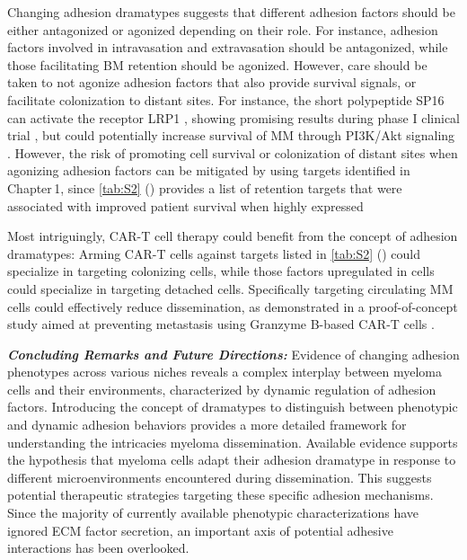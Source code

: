Changing adhesion dramatypes suggests that different adhesion factors should be
either antagonized or agonized depending on their role. For instance, adhesion
factors involved in intravasation and extravasation should be antagonized, while
those facilitating BM retention%
\footterm{\footretentiveadhesionfactors}{\label{foot:retentiveadhesionfactors}}%
should be agonized. However, care should be taken to not agonize adhesion
factors that also provide survival signals, or facilitate colonization to
distant sites. For instance, the short polypeptide SP16 can activate the
receptor LRP1 , showing promising results during phase I
clinical trial \cite{wohlfordPhaseClinicalTrial2021}, but could potentially
increase survival of MM through PI3K/Akt signaling
\cite{potereDevelopingLRP1Agonists2019, heinemannInhibitingPI3KAKT2022}.
However, the risk of promoting cell survival or colonization of distant sites
when agonizing adhesion factors can be mitigated by using targets identified in
Chapter\,1, since \autoref{tab:S2} () provides a list of
retention targets that were associated
with improved patient survival when highly expressed 

Most intriguingly, CAR-T cell therapy could benefit from the concept of adhesion
dramatypes: Arming CAR-T cells against targets listed in \autoref{tab:S2}
() could specialize in targeting colonizing cells, while those
factors upregulated in \nMAina cells could specialize in targeting detached
cells. Specifically targeting circulating MM cells could effectively reduce
dissemination, as demonstrated in a proof-of-concept study aimed at preventing
metastasis using Granzyme B-based CAR-T cells \cite{sunGranzymeBbasedCAR2024}.


\textbf{\textit{Concluding Remarks and Future Directions:}} Evidence of changing
adhesion phenotypes across various niches reveals a complex interplay between
myeloma cells and their environments, characterized by dynamic regulation of
adhesion factors. Introducing the concept of dramatypes to distinguish between
phenotypic and dynamic adhesion behaviors provides a more detailed framework for
understanding the intricacies myeloma dissemination. Available evidence supports
the hypothesis that myeloma cells adapt their adhesion dramatype in response to
different microenvironments encountered during dissemination. This suggests
potential therapeutic strategies targeting these specific adhesion mechanisms.
Since the majority of currently available phenotypic characterizations have
ignored \ac{ECM} factor secretion, an important axis of potential adhesive
interactions has been overlooked.


